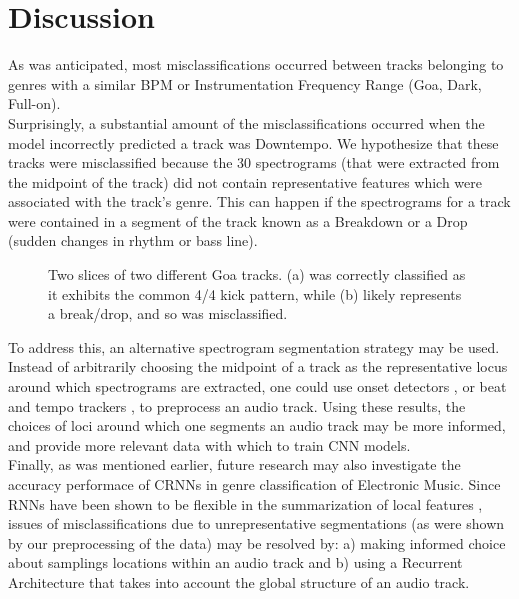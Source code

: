 \documentclass[12pt]{article}
\newcounter{ct}
\begin{document}
\section*{Discussion}
As was anticipated, most misclassifications occurred between tracks
belonging to
genres with a similar BPM or Instrumentation Frequency Range 
(Goa, Dark, Full-on). \\Surprisingly, a substantial amount of 
the misclassifications occurred when the model 
incorrectly predicted a track
was Downtempo. We hypothesize that these tracks were misclassified 
because the 30 spectrograms (that were
extracted from the midpoint of the track) 
did not contain representative features which were associated 
with the track's genre. This can happen if the spectrograms 
for a track were contained in a segment of the 
track known as a Breakdown or a Drop (sudden changes in 
rhythm or bass line).
\begin{figure}[H]%
    \centering
    \qquad\hspace{15mm}
    \caption{
        Two slices of two different Goa tracks. (a) was correctly 
        classified as it exhibits the common 4/4 kick pattern, while 
        (b) likely represents a break/drop, and so was misclassified.           
        }       
    \label{fig:example}%
\end{figure}

To address this, an alternative spectrogram segmentation strategy may 
be used.\\ Instead of arbitrarily choosing the midpoint of a track as the 
representative locus around which spectrograms are extracted,
one could use onset detectors \cite{c14}, or beat and tempo trackers 
\cite{c15}, to 
preprocess an audio track. Using these results, the choices of loci
around which one segments an audio track may be more informed,
and provide more relevant data with which to train CNN models.\\
Finally, as was mentioned earlier, future research may also 
investigate the accuracy performace of CRNNs in genre classification
of Electronic Music. Since RNNs have been shown to be flexible 
in the summarization of local features \cite{c6}, issues 
of misclassifications due to unrepresentative segmentations (as were
shown by our preprocessing of the data) may be resolved by: a) making
informed choice about samplings locations within an audio track and b)
using a Recurrent Architecture that takes into account the global
structure of an audio track.
\end{document}
